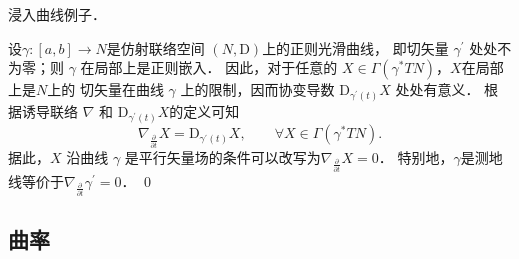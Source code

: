 \begin{example}
    浸入曲线例子．
\end{example}
设$\gamma:[a, b] \rightarrow N$是仿射联络空间 $(N, \mathrm{D})$上的正则光滑曲线，
即切矢量 $\gamma^{\prime}$ 处处不为零；则 $\gamma$ 在局部上是正则嵌入．
因此，对于任意的 $X \in \Gamma(\gamma^* TN)$，$X$在局部上是$N$上的
切矢量在曲线 $\gamma$ 上的限制，因而协变导数 $\mathrm{D}_{\gamma^{\prime}(t)} X$ 处处有意义．
根据诱导联络 $\nabla$ 和 $\mathrm{D}_{\gamma^{\prime}(t)} X$的定义可知
\begin{equation}
    \nabla_{\frac{\partial}{\partial t}} X=\mathrm{D}_{\gamma^{\prime}(t)} X, 
    \qquad \forall X \in \Gamma(\gamma^* T N) .
\end{equation}
据此，$X$ 沿曲线 $\gamma$ 是平行矢量场的条件可以改写为$\nabla_{\frac{\partial}{\partial t}} X=0$．
特别地，$\gamma$是测地线等价于$\nabla_{\frac{\partial}{\partial t}} \gamma^{\prime}=0$．
\qed



\subsection{曲率}\label{chfb:sec_curvature}


